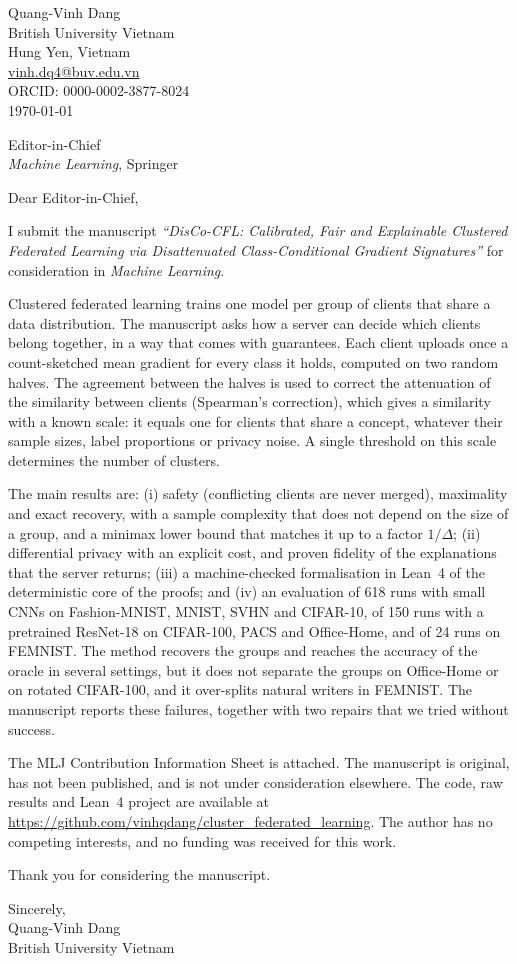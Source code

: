 \documentclass[10.5pt]{article}
\begin{document}
\begin{flushright}
Quang-Vinh Dang\\ British University Vietnam\\ Hung Yen, Vietnam\\ \href{mailto:vinh.dq4@buv.edu.vn}{vinh.dq4@buv.edu.vn}\\ ORCID: 0000-0002-3877-8024\\[0.6em]
\today
\end{flushright}

Editor-in-Chief\\
\emph{Machine Learning}, Springer

Dear Editor-in-Chief,

I submit the manuscript \emph{``DisCo-CFL: Calibrated, Fair and Explainable Clustered Federated Learning via Disattenuated Class-Conditional Gradient Signatures''} for consideration in \emph{Machine Learning}.

Clustered federated learning trains one model per group of clients that share a data distribution. The manuscript asks how a server can decide which clients belong together, in a way that comes with guarantees. Each client uploads once a count-sketched mean gradient for every class it holds, computed on two random halves. The agreement between the halves is used to correct the attenuation of the similarity between clients (Spearman's correction), which gives a similarity with a known scale: it equals one for clients that share a concept, whatever their sample sizes, label proportions or privacy noise. A single threshold on this scale determines the number of clusters.

The main results are: (i) safety (conflicting clients are never merged), maximality and exact recovery, with a sample complexity that does not depend on the size of a group, and a minimax lower bound that matches it up to a factor $1/\Delta$; (ii) differential privacy with an explicit cost, and proven fidelity of the explanations that the server returns; (iii) a machine-checked formalisation in Lean~4 of the deterministic core of the proofs; and (iv) an evaluation of 618 runs with small CNNs on Fashion-MNIST, MNIST, SVHN and CIFAR-10, of 150 runs with a pretrained ResNet-18 on CIFAR-100, PACS and Office-Home, and of 24 runs on FEMNIST. The method recovers the groups and reaches the accuracy of the oracle in several settings, but it does not separate the groups on Office-Home or on rotated CIFAR-100, and it over-splits natural writers in FEMNIST. The manuscript reports these failures, together with two repairs that we tried without success.

The MLJ Contribution Information Sheet is attached. The manuscript is original, has not been published, and is not under consideration elsewhere. The code, raw results and Lean~4 project are available at \url{https://github.com/vinhqdang/cluster_federated_learning}. The author has no competing interests, and no funding was received for this work.

Thank you for considering the manuscript.

Sincerely,\\[1.2em]
Quang-Vinh Dang\\
British University Vietnam
\end{document}
